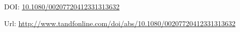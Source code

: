 \documentclass[a4paper,12pt]{article}
\begin{document}
\thispagestyle{empty}

\vspace{3cm}

\nocite{FDB-art-4}

\printbibliography

\vspace{3cm}
DOI: \href{http://dx.doi.org/10.1080/00207720412331313632}{10.1080/00207720412331313632}

\vspace{1.5cm}
Url: \url{http://www.tandfonline.com/doi/abs/10.1080/00207720412331313632}

\newpage

\end{document}
